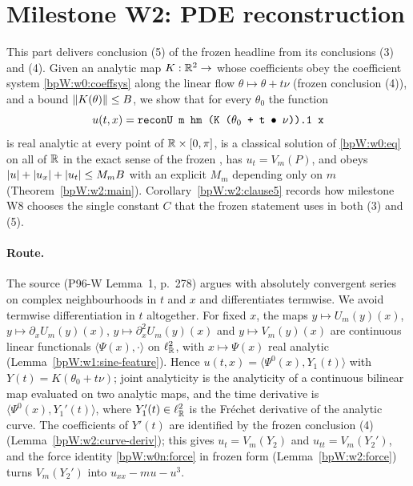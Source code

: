 \section{Milestone W2: PDE reconstruction}\label{bpW:w2}

This part delivers conclusion (5) of the frozen headline  from its conclusions (3) and (4).
Given an analytic map $K:\mathbb{R}^2\to$  whose coefficients obey the coefficient system
\eqref{bpW:w0:coeffsys} along the linear flow $\theta\mapsto\theta+t\nu$ (frozen conclusion (4)), and a bound
$\lVert K(\theta)\rVert\le B$, we show that for every $\theta_0$ the function
\[u(t,x)=\texttt{reconU m hm (K ($\theta_0$ + t $\bullet$ $\nu$)).1 x}\]
is real analytic at every point of $\mathbb{R}\times[0,\pi]$, is a classical solution of \eqref{bpW:w0:eq} on all of $\mathbb{R}$ in
the exact sense of the frozen , has $u_t=V_m(P)$, and obeys
$\lvert u\rvert+\lvert u_x\rvert+\lvert u_t\rvert\le M_mB$ with an explicit $M_m$ depending only on $m$
(Theorem~\ref{bpW:w2:main}). Corollary~\ref{bpW:w2:clause5} records how milestone W8 chooses the single constant $C$
that the frozen statement uses in both (3) and (5).

\paragraph{Route.} The source (P96-W Lemma~1, p.~278) argues with absolutely convergent series on complex
neighbourhoods in $t$ and $x$ and differentiates termwise. We avoid termwise differentiation in $t$ altogether. For
fixed $x$, the maps $y\mapsto U_m(y)(x)$, $y\mapsto\partial_xU_m(y)(x)$, $y\mapsto\partial_x^2U_m(y)(x)$ and
$y\mapsto V_m(y)(x)$ are continuous linear functionals $\langle\Psi(x),\cdot\rangle$ on $\ell^2_{\mathbb{R}}$, with
$x\mapsto\Psi(x)$ real analytic (Lemma~\ref{bpW:w1:sine-feature}). Hence $u(t,x)=\langle\Psi^0(x),Y_1(t)\rangle$ with
$Y(t)=K(\theta_0+t\nu)$; joint analyticity is the analyticity of a continuous bilinear map evaluated on two analytic
maps, and the time derivative is $\langle\Psi^0(x),Y_1'(t)\rangle$, where $Y_1'(t)\in\ell^2_{\mathbb{R}}$ is the Fr\'echet
derivative of the analytic curve. The coefficients of $Y'(t)$ are identified by the frozen conclusion (4)
(Lemma~\ref{bpW:w2:curve-deriv}); this gives $u_t=V_m(Y_2)$ and $u_{tt}=V_m(Y_2')$, and the force identity
\eqref{bpW:w0n:force} in frozen form (Lemma~\ref{bpW:w2:force}) turns $V_m(Y_2')$ into $u_{xx}-mu-u^3$.

